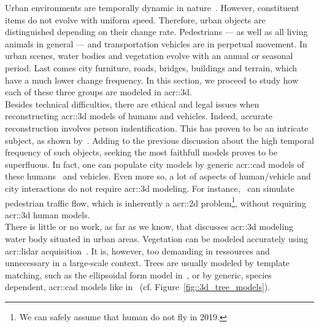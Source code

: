             Urban environments are temporally dynamic in nature~\parencite{vanhoey2017varcity}.
            However, constituent items do not evolve with uniform speed.
            Therefore, urban objects are distinguished depending on their change rate.
            Pedestrians --- as well as all living animals in general --- and transportation vehicles are in perpetual movement.
            In urban scenes, water bodies and vegetation evolve with an annual or seasonal period.
            Last comes city furniture, roads, bridges, buildings and terrain, which have a much lower change frequency.
            In this section, we proceed to study how each of these three groups are modeled in \gls{acr::3d}.\\

            Besides technical difficulties, there are ethical and legal issues when reconstructing \gls{acr::3d} models of humans and vehicles.
            Indeed, accurate reconstruction involves person indentification.
            This has proven to be an intricate subject, as shown by~\textcite{thornton2010individual,tavani2011ethics}.
            Adding to the previous discussion about the high temporal frequency of such objects, seeking the most faithfull models proves to be superfluous.
            In fact, one can populate city models by generic \gls{acr::cad} models of these humans~\parencite{shao2007autonomous} and vehicles.
            Even more so, a lot of aspects of human/vehicle and city interactions do not require \gls{acr::3d} modeling.
            For instance,~\textcite{lovaas1994modeling} can simulate pedestrian traffic flow, which is inherently a \gls{acr::2d} problem\footnote{
                We can safely assume that human do not fly in 2019.
            }, without requiring \gls{acr::3d} human models.\\
            There is little or no work, as far as we know, that discusses \gls{acr::3d} modeling water body situated in urban areas.
            Vegetation can be modeled accurately using \gls{acr::lidar} acquisition~\parencite{omasa20063d}.
            It is, however, too demanding in ressources and unnecessary in a large-scale context.
            Trees are usually modeled by template matching, such as the ellipsoidal form model in~\parencite{lafarge2012creating}, or by generic, species dependent, \gls{acr::cad} models like in~\parencite{iovan2008detection} (cf. Figure~\ref{fig::3d_tree_models}).\\
